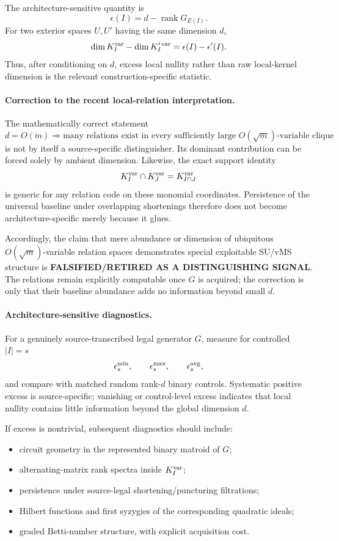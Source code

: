 \documentclass[11pt]{article}
\begin{document}
The architecture-sensitive quantity is
\[
\boxed{
\epsilon(I)=d-\operatorname{rank}G_{E(I)}.
}
\]
For two exterior spaces \(U,U'\) having the same dimension \(d\),
\[
\dim K_I^{\rm var}
-
\dim K_I^{\prime\,\rm var}
=
\epsilon(I)-\epsilon'(I).
\]
Thus, after conditioning on \(d\), excess local nullity rather than raw local-kernel dimension is the relevant construction-specific statistic.

\paragraph{Correction to the recent local-relation interpretation.}
The mathematically correct statement
\[
d=O(m)
\Longrightarrow
\text{many relations exist in every sufficiently large }O(\sqrt m)\text{-variable clique}
\]
is not by itself a source-specific distinguisher. Its dominant contribution can be forced solely by ambient dimension. Likewise, the exact support identity
\[
K_I^{\rm var}\cap K_J^{\rm var}
=
K_{I\cap J}^{\rm var}
\]
is generic for any relation code on these monomial coordinates. Persistence of the universal baseline under overlapping shortenings therefore does not become architecture-specific merely because it glues.

Accordingly, the claim that mere abundance or dimension of ubiquitous \(O(\sqrt m)\)-variable relation spaces demonstrates special exploitable SU/vMS structure is \textbf{FALSIFIED/RETIRED AS A DISTINGUISHING SIGNAL}. The relations remain explicitly computable once \(G\) is acquired; the correction is only that their baseline abundance adds no information beyond small \(d\).

\paragraph{Architecture-sensitive diagnostics.}
For a genuinely source-transcribed legal generator \(G\), measure for controlled \(|I|=s\)
\[
\epsilon_s^{\min},
\qquad
\epsilon_s^{\max},
\qquad
\epsilon_s^{\rm avg},
\]
and compare with matched random rank-\(d\) binary controls. Systematic positive excess is source-specific; vanishing or control-level excess indicates that local nullity contains little information beyond the global dimension \(d\).

If excess is nontrivial, subsequent diagnostics should include:
\begin{itemize}
\item circuit geometry in the represented binary matroid of \(G\);
\item alternating-matrix rank spectra inside \(K_I^{\rm var}\);
\item persistence under source-legal shortening/puncturing filtrations;
\item Hilbert functions and first syzygies of the corresponding quadratic ideals;
\item graded Betti-number structure, with explicit acquisition cost.
\end{itemize}
\end{document}
